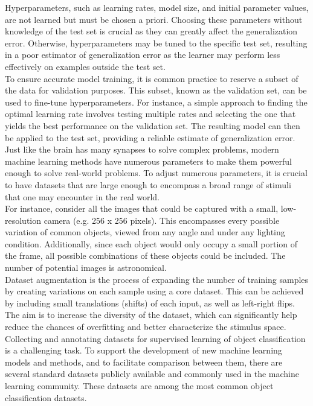 \noindent Hyperparameters, such as learning rates, model size, and initial parameter values, are not learned but must be chosen a priori. Choosing these parameters without knowledge of the test set is crucial as they can greatly affect the generalization error. Otherwise, hyperparameters may be tuned to the specific test set, resulting in a poor estimator of generalization error as the learner may perform less effectively on examples outside the test set. \\

\noindent To ensure accurate model training, it is common practice to reserve a subset of the data for validation purposes. This subset, known as the validation set, can be used to fine-tune hyperparameters. For instance, a simple approach to finding the optimal learning rate involves testing multiple rates and selecting the one that yields the best performance on the validation set. The resulting model can then be applied to the test set, providing a reliable estimate of generalization error. \\

\noindent Just like the brain has many synapses to solve complex problems, modern machine learning methods have numerous parameters to make them powerful enough to solve real-world problems. To adjust numerous parameters, it is crucial to have datasets that are large enough to encompass a broad range of stimuli that one may encounter in the real world. \\

\noindent For instance, consider all the images that could be captured with a small, low-resolution camera (e.g. 256 x 256 pixels). This encompasses every possible variation of common objects, viewed from any angle and under any lighting condition. Additionally, since each object would only occupy a small portion of the frame, all possible combinations of these objects could be included. The number of potential images is astronomical. \\

\noindent Dataset augmentation is the process of expanding the number of training samples by creating variations on each sample using a core dataset. This can be achieved by including small translations (shifts) of each input, as well as left-right flips. The aim is to increase the diversity of the dataset, which can significantly help reduce the chances of overfitting and better characterize the stimulus space. \\

\noindent Collecting and annotating datasets for supervised learning of object classification is a challenging task. To support the development of new machine learning models and methods, and to facilitate comparison between them, there are several standard datasets publicly available and commonly used in the machine learning community. These datasets are among the most common object classification datasets. \\

